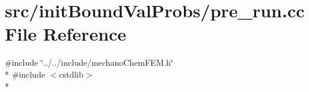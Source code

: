 \section{src/init\-Bound\-Val\-Probs/pre\-\_\-run.cc File Reference}
\label{pre__run_8cc}
{\ttfamily \#include \char`\"{}../../include/mechano\-Chem\-F\-E\-M.\-h\char`\"{}}\\*
{\ttfamily \#include $<$cstdlib$>$}\\*
